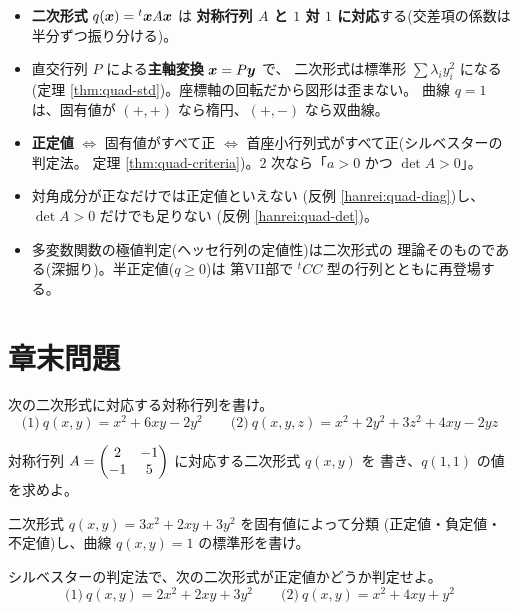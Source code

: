 \begin{matome}
\begin{itemize}
\item \textbf{二次形式} $q(\bm{x}) = {}^t\bm{x}A\bm{x}$ は
\textbf{対称行列 $A$ と $1$ 対 $1$ に対応}する(交差項の係数は
半分ずつ振り分ける)。
\item 直交行列 $P$ による\textbf{主軸変換} $\bm{x} = P\bm{y}$ で、
二次形式は標準形 $\sum \lambda_iy_i^2$ になる
(定理 \ref{thm:quad-std})。座標軸の回転だから図形は歪まない。
曲線 $q = 1$ は、固有値が $(+, +)$ なら楕円、$(+, -)$ なら双曲線。
\item \textbf{正定値} $\iff$ 固有値がすべて正 $\iff$
首座小行列式がすべて正(シルベスターの判定法。
定理 \ref{thm:quad-criteria})。$2$ 次なら「$a > 0$ かつ $\det A > 0$」。
\item 対角成分が正なだけでは正定値といえない
(反例 \ref{hanrei:quad-diag})し、$\det A > 0$ だけでも足りない
(反例 \ref{hanrei:quad-det})。
\item 多変数関数の極値判定(ヘッセ行列の定値性)は二次形式の
理論そのものである(深掘り)。半正定値($q \ge 0$)は
第VII部で ${}^t\!CC$ 型の行列とともに再登場する。
\end{itemize}
\end{matome}

\section*{章末問題}

\begin{mondai}[基本]\label{q:quad-ex1}
次の二次形式に対応する対称行列を書け。
\[
\text{(1)}\ q(x, y) = x^2 + 6xy - 2y^2 \qquad
\text{(2)}\ q(x, y, z) = x^2 + 2y^2 + 3z^2 + 4xy - 2yz
\]
\end{mondai}

\begin{mondai}[基本]\label{q:quad-ex2}
対称行列 $A = \begin{pmatrix}2 & -1 \\ -1 & 5\end{pmatrix}$ に対応する二次形式 $q(x, y)$ を
書き、$q(1, 1)$ の値を求めよ。
\end{mondai}

\begin{mondai}[基本]\label{q:quad-ex3}
二次形式 $q(x, y) = 3x^2 + 2xy + 3y^2$ を固有値によって分類
(正定値・負定値・不定値)し、曲線 $q(x, y) = 1$ の標準形を書け。
\end{mondai}

\begin{mondai}[基本]\label{q:quad-ex4}
シルベスターの判定法で、次の二次形式が正定値かどうか判定せよ。
\[
\text{(1)}\ q(x, y) = 2x^2 + 2xy + 3y^2 \qquad
\text{(2)}\ q(x, y) = x^2 + 4xy + y^2
\]
\end{mondai}

